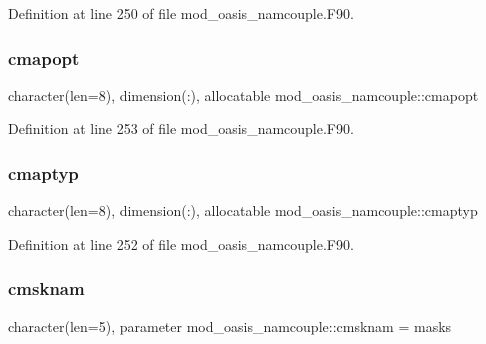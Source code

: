 Definition at line 250 of file mod\+\_\+oasis\+\_\+namcouple.\+F90.

\mbox{\label{namespacemod__oasis__namcouple_a3d7b34ed13d4ad8f86bbab3ad9956b6b}} 
\subsubsection{\texorpdfstring{cmapopt}{cmapopt}}
{\footnotesize\ttfamily character(len=8), dimension(\+:), allocatable mod\+\_\+oasis\+\_\+namcouple\+::cmapopt\hspace{0.3cm}{\ttfamily [private]}}



Definition at line 253 of file mod\+\_\+oasis\+\_\+namcouple.\+F90.

\mbox{\label{namespacemod__oasis__namcouple_a82b32aa4c78713443daf65a3dfbc75dc}} 
\subsubsection{\texorpdfstring{cmaptyp}{cmaptyp}}
{\footnotesize\ttfamily character(len=8), dimension(\+:), allocatable mod\+\_\+oasis\+\_\+namcouple\+::cmaptyp\hspace{0.3cm}{\ttfamily [private]}}



Definition at line 252 of file mod\+\_\+oasis\+\_\+namcouple.\+F90.

\mbox{\label{namespacemod__oasis__namcouple_aeeda85bec8a449e87411d4ed404322c5}} 
\subsubsection{\texorpdfstring{cmsknam}{cmsknam}}
{\footnotesize\ttfamily character(len=5), parameter mod\+\_\+oasis\+\_\+namcouple\+::cmsknam = \textquotesingle{}masks\textquotesingle{}\hspace{0.3cm}{\ttfamily [private]}}



